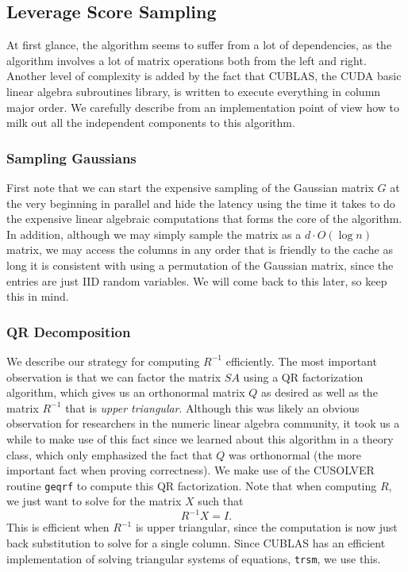 \documentclass[12pt]{article}
\begin{document}
\subsection{Leverage Score Sampling}\label{approach-leverage}
At first glance, the algorithm seems to suffer from a lot of dependencies, as the algorithm involves a lot of matrix operations both from the left and right. Another level of complexity is added by the fact that CUBLAS, the CUDA basic linear algebra subroutines library, is written to execute everything in column major order. We carefully describe from an implementation point of view how to milk out all the independent components to this algorithm.

\subsubsection{Sampling Gaussians}
First note that we can start the expensive sampling of the Gaussian matrix $G$ at the very beginning in parallel and hide the latency using the time it takes to do the expensive linear algebraic computations that forms the core of the algorithm. In addition, although we may simply sample the matrix as a $d\cdot O(\log n)$ matrix, we may access the columns in any order that is friendly to the cache as long it is consistent with using a permutation of the Gaussian matrix, since the entries are just IID random variables. We will come back to this later, so keep this in mind. 

\subsubsection{QR Decomposition}
We describe our strategy for computing $R^{-1}$ efficiently. The most important observation is that we can factor the matrix $SA$ using a QR factorization algorithm, which gives us an orthonormal matrix $Q$ as desired as well as the matrix $R^{-1}$ that is \emph{upper triangular}. Although this was likely an obvious observation for researchers in the numeric linear algebra community, it took us a while to make use of this fact since we learned about this algorithm in a theory class, which only emphasized the fact that $Q$ was orthonormal (the more important fact when proving correctness). We make use of the CUSOLVER routine \texttt{geqrf} to compute this QR factorization. Note that when computing $R$, we just want to solve for the matrix $X$ such that
\[
	R^{-1}X = I.
\]
This is efficient when $R^{-1}$ is upper triangular, since the computation is now just back substitution to solve for a single column. Since CUBLAS has an efficient implementation of solving triangular systems of equations, \texttt{trsm}, we use this. 
\end{document}
